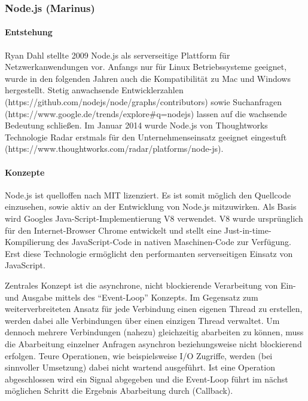 \subsubsection{Node.js (Marinus)}\label{node.js-marinus}

\paragraph{Entstehung}\label{entstehung}

Ryan Dahl stellte 2009 Node.js als serverseitige Plattform für
Netzwerkanwendungen vor. Anfangs nur für Linux Betriebssysteme geeignet,
wurde in den folgenden Jahren auch die Kompatibilität zu Mac und Windows
hergestellt. Stetig anwachsende Entwicklerzahlen
(https://github.com/nodejs/node/graphs/contributors) sowie Suchanfragen
(https://www.google.de/trends/explore\#q=nodejs) lassen auf die
wachsende Bedeutung schließen. Im Januar 2014 wurde Node.js von
Thoughtworks Technologie Radar erstmals für den Unternehmenseinsatz
geeignet eingestuft
(https://www.thoughtworks.com/radar/platforms/node-js).

\paragraph{Konzepte}\label{konzepte-1}

Node.js ist quelloffen nach MIT lizenziert. Es ist somit möglich den
Quellcode einzusehen, sowie aktiv an der Entwicklung von Node.js
mitzuwirken. Als Basis wird Googles Java-Script-Implementierung V8
verwendet. V8 wurde ursprünglich für den Internet-Browser Chrome
entwickelt und stellt eine Just-in-time-Kompilierung des JavaScript-Code
in nativen Maschinen-Code zur Verfügung. Erst diese Technologie
ermöglicht den performanten serverseitigen Einsatz von JavaScript.

Zentrales Konzept ist die asynchrone, nicht blockierende Verarbeitung
von Ein- und Ausgabe mittels des ``Event-Loop'' Konzepts. Im Gegensatz
zum weiterverbreiteten Ansatz für jede Verbindung einen eigenen Thread
zu erstellen, werden dabei alle Verbindungen über einen einzigen Thread
verwaltet. Um dennoch mehrere Verbindungen (nahezu) gleichzeitig
abarbeiten zu können, muss die Abarbeitung einzelner Anfragen asynchron
beziehungsweise nicht blockierend erfolgen. Teure Operationen, wie
beispielsweise I/O Zugriffe, werden (bei sinnvoller Umsetzung) dabei
nicht wartend ausgeführt. Ist eine Operation abgeschlossen wird ein
Signal abgegeben und die Event-Loop führt im nächst möglichen Schritt
die Ergebnis Abarbeitung durch (Callback).

